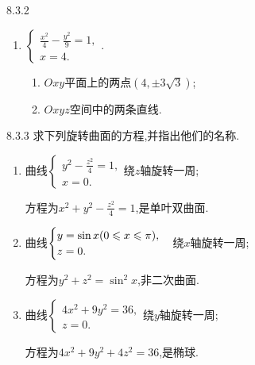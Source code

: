 \begin{exercise}{8.3.2}
\begin{enumerate}
        \item $\begin{cases}
            \frac{x^2}{4}-\frac{y^2}{9}=1,\\
            x=4.
        \end{cases}$.
        \begin{solution}
            \begin{multicols}{2}
            \begin{enumerate}
                \item $Oxy$平面上的两点$(4,\pm 3\sqrt{3})$;
                \item $Oxyz$空间中的两条直线.
            \end{enumerate}
            \end{multicols}
        \end{solution}
    \end{enumerate}
\end{exercise}

\begin{exercise}{8.3.3}
    求下列旋转曲面的方程,并指出他们的名称.
    \begin{enumerate}
        \item 曲线$\begin{cases}
            y^2-\frac{z^2}{4}=1,\\
            x=0.
        \end{cases}$绕$z$轴旋转一周;
        \begin{solution}
            方程为$x^2+y^2-\frac{z^2}{4}=1$,是单叶双曲面.
        \end{solution}

        \item 曲线$\begin{cases}
            y=\sin x(0\leqslant x\leqslant \pi),\\
            z=0.
        \end{cases}$绕$x$轴旋转一周;
        \begin{solution}
            方程为$y^2+z^2=\sin^2 x$,非二次曲面.
        \end{solution}

        \item 曲线$\begin{cases}
            4x^2+9y^2=36,\\
            z=0.
        \end{cases}$绕$y$轴旋转一周;
        \begin{solution}
            方程为$4x^2+9y^2+4z^2=36$,是椭球.
        \end{solution}
    \end{enumerate}
\end{exercise}

